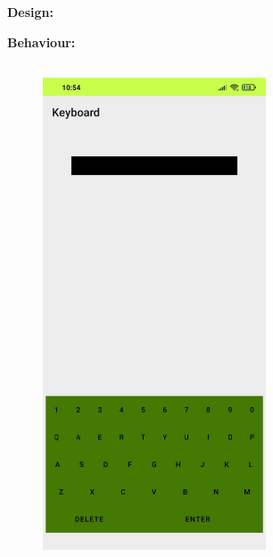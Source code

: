 \documentclass[12pt,letterpaper]{article}
\begin{document}
\subsubsection*{}
\textbf{Design:}
\begin{flushleft}

\end{flushleft}
\textbf{Behaviour:}
\begin{flushleft}

\end{flushleft}

\newpage
\subsection*{}
\begin{figure}[h]
    \centering
    \includegraphics[height=14cm, keepaspectratio]{Keyboard/Outputs/OP4.png}
\end{figure}
\end{document}
